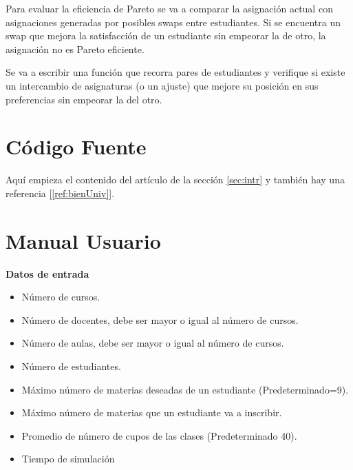 \documentclass{article}
\begin{document}
Para evaluar la eficiencia de Pareto se va a comparar la asignación actual con asignaciones 
generadas por posibles swaps entre estudiantes. Si se encuentra un swap que mejora la 
satisfacción de un estudiante sin empeorar la de otro, la asignación no es Pareto eficiente.

Se va a escribir una función que recorra pares de estudiantes y verifique si existe un 
intercambio de asignaturas (o un ajuste) que mejore su posición en sus preferencias 
sin empeorar la del otro.



\section{Código Fuente}\label{sec:cod}
Aquí empieza el contenido del artículo de la sección \ref{sec:intr} y también hay una referencia [\ref{ref:bienUniv}].



\section{Manual Usuario}\label{sec:man_u}

\textbf{Datos de entrada}

\begin{itemize}
  \item Número de cursos.
  \item Número de docentes, debe ser mayor o igual al número de cursos.
  \item Número de aulas, debe ser mayor o igual al número de cursos.
  \item Número de estudiantes.
  \item Máximo número de materias deseadas de un estudiante (Predeterminado=9).
  \item Máximo número de materias que un estudiante va a inscribir.
  \item Promedio de número de cupos de las clases (Predeterminado 40).
  \item Tiempo de simulación
\end{itemize}
\end{document}
